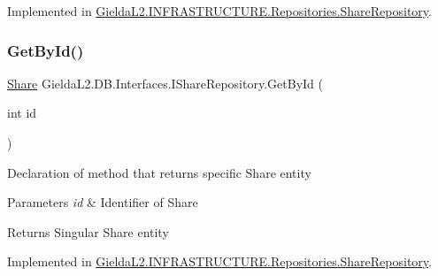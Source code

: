 Implemented in \mbox{\hyperlink{class_gielda_l2_1_1_i_n_f_r_a_s_t_r_u_c_t_u_r_e_1_1_repositories_1_1_share_repository_aef8271595f290092d8b99d4789c8f37c}{Gielda\+L2.\+I\+N\+F\+R\+A\+S\+T\+R\+U\+C\+T\+U\+R\+E.\+Repositories.\+Share\+Repository}}.

\mbox{\label{interface_gielda_l2_1_1_d_b_1_1_interfaces_1_1_i_share_repository_af252fb27ec646e120265e2f71c83677a}} 
\subsubsection{\texorpdfstring{GetById()}{GetById()}}
{\footnotesize\ttfamily \mbox{\hyperlink{class_gielda_l2_1_1_d_b_1_1_entities_1_1_share}{Share}} Gielda\+L2.\+D\+B.\+Interfaces.\+I\+Share\+Repository.\+Get\+By\+Id (\begin{DoxyParamCaption}\item[{int}]{id }\end{DoxyParamCaption})}





Declaration of method that returns specific Share entity


\begin{DoxyParams}{Parameters}
{\em id} & Identifier of Share\\
\hline
\end{DoxyParams}
\begin{DoxyReturn}{Returns}
Singular Share entity
\end{DoxyReturn}


Implemented in \mbox{\hyperlink{class_gielda_l2_1_1_i_n_f_r_a_s_t_r_u_c_t_u_r_e_1_1_repositories_1_1_share_repository_ac034dd25c3630f8641baf9e7eafe94db}{Gielda\+L2.\+I\+N\+F\+R\+A\+S\+T\+R\+U\+C\+T\+U\+R\+E.\+Repositories.\+Share\+Repository}}.

\mbox{\label{interface_gielda_l2_1_1_d_b_1_1_interfaces_1_1_i_share_repository_a270dc411526d961bac26e1df19ae2563}} 
